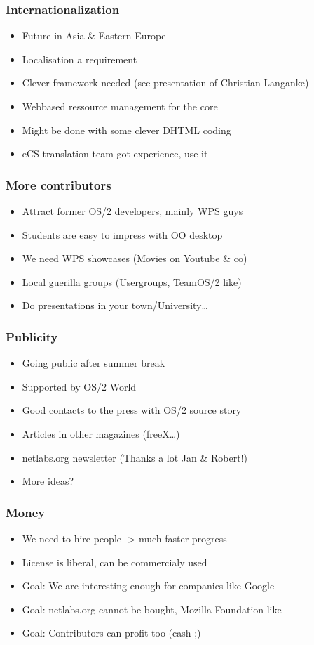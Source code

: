 \documentclass{beamer}
\begin{document}
\begin{frame}
\frametitle{Internationalization}
\begin{itemize}[<+->]
  \item Future in Asia \& Eastern Europe
  \item Localisation a requirement
  \item Clever framework needed (see presentation of Christian Langanke)
  \item Webbased ressource management for the core
  \item Might be done with some clever DHTML coding
  \item eCS translation team got experience, use it
\end{itemize}
\end{frame}

\begin{frame}
\frametitle{More contributors}
\begin{itemize}[<+->]
  \item Attract former OS/2 developers, mainly WPS guys
  \item Students are easy to impress with OO desktop
  \item We need WPS showcases (Movies on Youtube \& co)
  \item Local guerilla groups (Usergroups, TeamOS/2 like)
  \item Do presentations in your town/University\ldots
\end{itemize}
\end{frame}

\begin{frame}
\frametitle{Publicity}
\begin{itemize}[<+->]
  \item Going public after summer break
  \item Supported by OS/2 World
  \item Good contacts to the press with OS/2 source story
  \item Articles in other magazines (freeX\ldots)
  \item netlabs.org newsletter (Thanks a lot Jan \& Robert!)
  \item More ideas?
\end{itemize}
\end{frame}

\begin{frame}
\frametitle{Money}
\begin{itemize}[<+->]
  \item We need to hire people -> much faster progress
  \item License is liberal, can be commercialy used
  \item Goal: We are interesting enough for companies like Google
  \item Goal: netlabs.org cannot be bought, Mozilla Foundation like
  \item Goal: Contributors can profit too (cash ;)
\end{itemize}
\end{frame}
\end{document}
